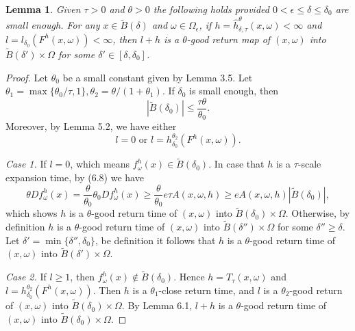\documentclass[11pt,oneside]{article}
\theoremstyle{plain}
\newtheorem{lem}{Lemma}[section]
\numberwithin{equation}{section}
\numberwithin{figure}{section}
\numberwithin{table}{section}
\begin{document}
\begin{lem}

Given $\tau>0$ and $\theta>0$ the following holds provided $0 < \epsilon \leq \delta \leq \delta_0$ are small enough. For any $x \in \tilde B(\delta)$ and $\omega \in \Omega_{\epsilon}$, if $h = \hat h_{\delta, \tau}^{\theta} (x, \omega) < \infty$ and $l = l_{\delta_0} (F^h(x, \omega)) < \infty$, then $l+h$ is a $\theta$-good return map of $(x, \omega)$ into $\tilde B(\delta') \times \Omega$ for some $\delta' \in [\delta, \delta_0]$.

\end{lem}


\begin{proof}

Let $\theta_0$ be a small constant given by Lemma 3.5. Let $\theta_1 = \max\{ \theta_0/\tau, 1 \}, \theta_2 = \theta/(1 + \theta_1)$. If $\delta_0$ is small enough, then 
\begin{equation}
| \tilde B(\delta_0) | \leq  \frac{\tau \theta}{\theta_0}.
\end{equation}
Moreover, by Lemma 5.2, we have either
\begin{equation}
l=0 \mbox{ or \ } l = h_{\delta_0}^{\theta_2} (F^h(x, \omega)).
\end{equation}

{\it Case 1.}  If $l=0$, which means $f_{\omega}^h(x) \in \tilde B(\delta_0)$. In case that $h$ is a $\tau$-scale expansion time, by (6.8) we have
\[
\theta Df_{\omega}^h(x) = \frac{\theta}{\theta_0} \theta_0 Df_{\omega}^h(x) \geq \frac{\theta}{\theta_0} e\tau A(x, \omega, h) \geq e A(x, \omega, h) |\tilde B(\delta_0)|,
\]
which shows $h$ is a $\theta$-good return time of $(x, \omega)$ into $\tilde B(\delta_0) \times \Omega$. Otherwise, by definition $h$ is a $\theta$-good return time of $(x, \omega)$ into $\tilde B(\delta'') \times \Omega$ for some $\delta'' \geq \delta$. Let $\delta' = \min\{ \delta'', \delta_0 \}$, be definition it follows that $h$ is a $\theta$-good return time of $(x, \omega)$ into $\tilde B(\delta') \times \Omega$.


{\it Case 2.} If $l \geq 1$, then $f_{\omega}^h(x) \notin \tilde B(\delta_0)$. Hence $h = T_{\tau}(x, \omega)$ and 
$l = h_{\delta_0}^{\theta_2} (F^h(x, \omega))$. Then $h$ is a $\theta_1$-close return time, and $l$ is a $\theta_2$-good return of $(x, \omega)$ into $\tilde B(\delta_0) \times \Omega$. By Lemma 6.1, $l + h$ is a $\theta$-good return time of $(x, \omega)$ into $\tilde B(\delta_0) \times \Omega$.

\end{proof}
\end{document}
